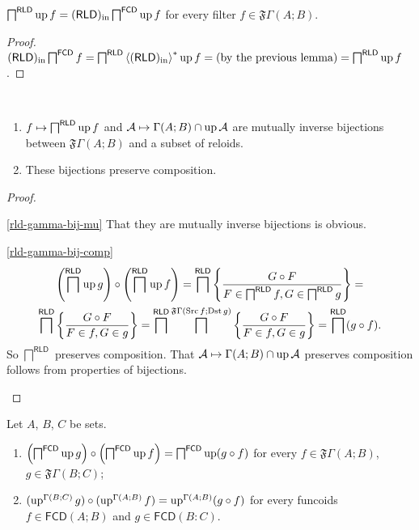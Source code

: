\begin{lem}
\label{rld-in-fcd-meet}$\bigsqcap^{\mathsf{RLD}}\operatorname{up} f=(\mathsf{RLD})_{\mathrm{in}}\bigsqcap^{\mathsf{FCD}}\operatorname{up} f$
for every filter $f\in\mathfrak{F}\Gamma(A;B)$.\end{lem}
\begin{proof}
$(\mathsf{RLD})_{\mathrm{in}}\bigsqcap^{\mathsf{FCD}}f=\bigsqcap^{\mathsf{RLD}}\left\langle (\mathsf{RLD})_{\mathrm{in}}\right\rangle ^{\ast}\operatorname{up} f=\text{(by the previous lemma)}=\bigsqcap^{\mathsf{RLD}}\operatorname{up} f$.\end{proof}
\begin{lem}
\label{rld-gamma-bij}~
\begin{enumerate}
\item \label{rld-gamma-bij-mu}$f\mapsto\bigsqcap^{\mathsf{RLD}}\operatorname{up} f$
and $\mathcal{A}\mapsto\Gamma(A;B)\cap\operatorname{up}\mathcal{A}$ are mutually
inverse bijections between $\mathfrak{F}\Gamma(A;B)$ and a subset
of reloids.
\item \label{rld-gamma-bij-comp}These bijections preserve composition.
\end{enumerate}
\end{lem}
\begin{proof}
~
\begin{widedisorder}
\item [{\ref{rld-gamma-bij-mu}}] That they are mutually inverse bijections
is obvious.
\item [{\ref{rld-gamma-bij-comp}}] ~
\begin{multline*}
\left(\bigsqcap^{\mathsf{RLD}}\operatorname{up} g\right)\circ\left(\bigsqcap^{\mathsf{RLD}}\operatorname{up} f\right)=\bigsqcap^{\mathsf{RLD}}\left\{ \frac{G\circ F}{F\in\bigsqcap^{\mathsf{RLD}}f,G\in\bigsqcap^{\mathsf{RLD}}g}\right\}=\\
\bigsqcap^{\mathsf{RLD}}\left\{ \frac{G\circ F}{F\in f,G\in g}\right\}=\bigsqcap^{\mathsf{RLD}}\bigsqcap^{\mathfrak{F}\Gamma(\operatorname{Src} f;\operatorname{Dst} g)}\left\{ \frac{G\circ F}{F\in f,G\in g}\right\}=\bigsqcap^{\mathsf{RLD}}(g\circ f).
\end{multline*}
So $\bigsqcap^{\mathsf{RLD}}$ preserves composition. That $\mathcal{A}\mapsto\Gamma(A;B)\cap\operatorname{up}\mathcal{A}$
preserves composition follows from properties of bijections.
\end{widedisorder}
\end{proof}
\begin{lem}
Let $A$, $B$, $C$ be sets.
\begin{enumerate}
\item $\left(\bigsqcap^{\mathsf{FCD}}\operatorname{up} g\right)\circ\left(\bigsqcap^{\mathsf{FCD}}\operatorname{up} f\right)=\bigsqcap^{\mathsf{FCD}}\operatorname{up}(g\circ f)$
for every $f\in\mathfrak{F}\Gamma(A;B)$, $g\in\mathfrak{F}\Gamma(B;C)$;
\item $(\operatorname{up}^{\Gamma(B;C)}g)\circ(\operatorname{up}^{\Gamma(A;B)}f)=\operatorname{up}^{\Gamma(A;B)}(g\circ f)$
for every funcoids $f\in\mathsf{FCD}(A;B)$ and $g\in\mathsf{FCD}(B:C)$.
\end{enumerate}
\end{lem}
